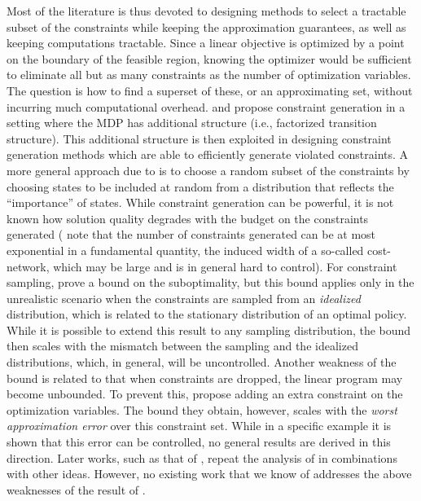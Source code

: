 Most of the literature is thus devoted to designing methods to select a tractable subset of the constraints while keeping the approximation guarantees, as well as keeping computations tractable. 
Since a linear objective is optimized by a point on the boundary of the feasible region, 
knowing the optimizer would be sufficient to eliminate all but 
as many constraints as the number of optimization variables.
The question is how to find a superset of these, or an approximating set, without incurring much computational overhead.
\citet{schuurmans} and \citet{gkp} propose constraint generation in a setting 
where the MDP has additional structure (i.e., factorized transition structure).
This additional structure is then exploited in designing constraint generation methods which are able to efficiently generate
violated constraints. A more general approach due to \citet{CS} 
is to choose a random subset of the constraints 
by choosing states to be included at random from a distribution that reflects the ``importance'' of states.
While constraint generation can be powerful,
it is not known how solution quality degrades with the budget on the constraints generated
(\citeauthor{gkp} note that the number of constraints generated can be at most exponential in a fundamental quantity,
the induced width of a so-called cost-network, which may be large and is in general hard to control).
For constraint sampling,  \citet{CS} prove a bound on the suboptimality, but this bound applies only 
in the unrealistic scenario when the constraints are sampled from an \emph{idealized} distribution,
which is related to the stationary distribution of an optimal policy. 
While it is possible to extend this result
to any sampling distribution, the bound then scales with the mismatch between the sampling and the idealized
distributions, which, in general, will be uncontrolled. 
Another weakness of the bound is related to that when constraints are dropped, the linear program may become
unbounded. To prevent this, \citet{CS}  propose adding an extra constraint on the optimization variables.
The bound they obtain, however, scales with the \emph{worst approximation error} over this constraint set.
While in a specific example it is shown that this error can be controlled, no general results are derived in this direction.
Later works, such as that of
\citet{SALP,BhatFaMo12:SALPNP},  repeat the analysis of \citet{CS}
in combinations with other ideas. However, no existing work that we know of addresses the above weaknesses of the result of \citet{CS}.

